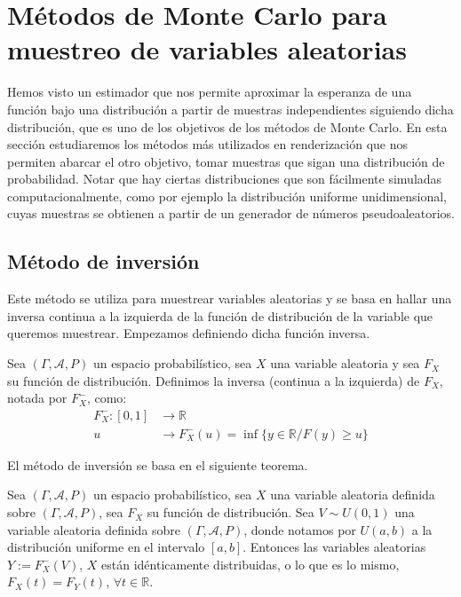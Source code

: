 \section{Métodos de Monte Carlo para muestreo de variables aleatorias}

Hemos visto un estimador que nos permite aproximar la esperanza de una función bajo una distribución a partir de muestras independientes siguiendo dicha distribución, que es uno de los objetivos de los métodos de Monte Carlo. En esta sección estudiaremos los métodos más utilizados en renderización que nos permiten abarcar el otro objetivo, tomar muestras que sigan una distribución de probabilidad. Notar que hay ciertas distribuciones que son fácilmente simuladas computacionalmente, como por ejemplo la distribución uniforme unidimensional, cuyas muestras se obtienen a partir de un generador de números pseudoaleatorios.

\subsection{Método de inversión}

Este método se utiliza para muestrear variables aleatorias y se basa en hallar una inversa continua a la izquierda de la función de distribución de la variable que queremos muestrear. Empezamos definiendo dicha función inversa.

\begin{definicion}
Sea $(\Gamma , \mathcal{A}, P)$ un espacio probabilístico, sea $X$ una variable aleatoria y sea $F_X$ su función de distribución. Definimos la inversa (continua a la izquierda) de $F_X$, notada por $F_X^-$, como:
\begin{align*}
F_X^-:[0,1]&\rightarrow \mathds{R}\\
u&\rightarrow F_X^-(u)=\inf \{y\in\mathds{R}/ F(y)\geq u\}
\end{align*}
\end{definicion}

El método de inversión se basa en el siguiente teorema.

\begin{teorema}
Sea $(\Gamma , \mathcal{A}, P)$ un espacio probabilístico, sea $X$ una variable aleatoria definida sobre $(\Gamma , \mathcal{A}, P)$, sea $F_X$ su función de distribución. Sea $V\sim U(0,1)$ una variable aleatoria definida sobre $(\Gamma , \mathcal{A}, P)$, donde notamos por $U(a,b)$ a la distribución uniforme en el intervalo $[a,b]$. Entonces las variables aleatorias $Y:=F_X^-(V)$, $X$ están idénticamente distribuidas, o lo que es lo mismo, $F_X(t) = F_Y(t)$, $\forall t\in\mathds{R}$.
\end{teorema}

